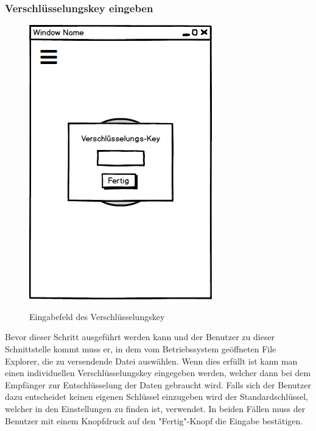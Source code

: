 \subsubsection{Verschlüsselungskey eingeben}
\begin{figure}[H]
	\centering
	\includegraphics[width=.7\linewidth]{pictures/Desktop/Verschluesselungskey.png}\
	\caption{Eingabefeld des Verschlüsselungskey}
\end{figure}
Bevor dieser Schritt ausgeführt werden kann und der Benutzer zu dieser Schnittstelle kommt muss er, in dem vom Betriebssystem geöffneten File Explorer, die zu versendende Datei auswählen. Wenn dies erfüllt ist kann man einen individuellen Verschlüsselungskey eingegeben werden, welcher dann bei dem Empfänger zur Entschlüsselung der Daten gebraucht wird. Falls sich der Benutzer dazu entscheidet keinen eigenen Schlüssel einzugeben wird der Standardschlüssel, welcher in den Einstellungen zu finden ist, verwendet. In beiden Fällen muss der Benutzer mit einem Knopfdruck auf den "Fertig"-Knopf die Eingabe bestätigen.
